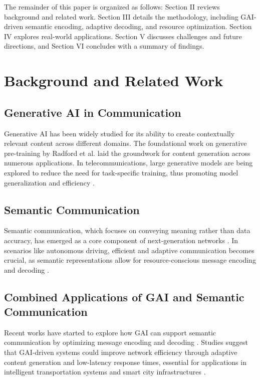 \documentclass[journal]{IEEEtran}
\begin{document}
The remainder of this paper is organized as follows: Section II reviews background and related work. Section III details the methodology, including GAI-driven semantic encoding, adaptive decoding, and resource optimization. Section IV explores real-world applications. Section V discusses challenges and future directions, and Section VI concludes with a summary of findings.

\section{Background and Related Work}

\subsection{Generative AI in Communication}
Generative AI has been widely studied for its ability to create contextually relevant content across different domains. The foundational work on generative pre-training by Radford et al. \cite{Radford2018ImprovingLU} laid the groundwork for content generation across numerous applications. In telecommunications, large generative models are being explored to reduce the need for task-specific training, thus promoting model generalization and efficiency \cite{bariah2023largegenerativeaimodels,10614204}.

\subsection{Semantic Communication}
Semantic communication, which focuses on conveying meaning rather than data accuracy, has emerged as a core component of next-generation networks \cite{9955312}. In scenarios like autonomous driving, efficient and adaptive communication becomes crucial, as semantic representations allow for resource-conscious message encoding and decoding \cite{10319661,raha2023generativeaidrivensemanticcommunication}.

\subsection{Combined Applications of GAI and Semantic Communication}
Recent works have started to explore how GAI can support semantic communication by optimizing message encoding and decoding \cite{10447237}. Studies suggest that GAI-driven systems could improve network efficiency through adaptive content generation and low-latency response times, essential for applications in intelligent transportation systems and smart city infrastructures \cite{jiang2024largeaimodelbasedsemantic}.
\end{document}
